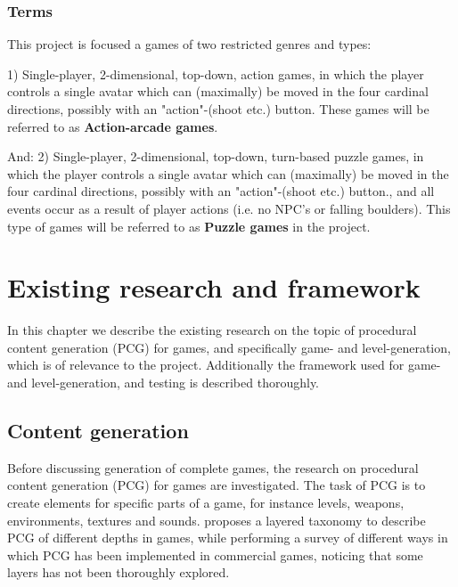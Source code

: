 \documentclass[a4paper,titlepage,final]{report}
\begin{document}
\subsection{Terms}
This project is focused a games of two restricted genres and types: 

1) Single-player, 2-dimensional, top-down, action games, in which the player controls a single avatar which can (maximally) be moved in the four cardinal directions, possibly with an "action"-(shoot etc.) button.
These games will be referred to as \textbf{Action-arcade games}.

And: 2) Single-player, 2-dimensional, top-down, turn-based puzzle games, in which the player controls a single avatar which can (maximally) be moved in the four cardinal directions, possibly with an "action"-(shoot etc.) button., and all events occur as a result of player actions (i.e. no NPC's or falling boulders). 
This type of games will be referred to as \textbf{Puzzle games} in the project.

\chapter{Existing research and framework}
In this chapter we describe the existing research on the topic of procedural content generation (PCG) for games, and specifically game- and level-generation, which is of relevance to the project.
Additionally the framework used for game- and level-generation, and testing is described thoroughly.



\section{Content generation}

Before discussing generation of complete games, the research on procedural content generation (PCG) for games are investigated. 
The task of PCG is to create elements for specific parts of a game, for instance levels, weapons, environments, textures and sounds. 
\citet{hendrikx2013procedural} proposes a layered taxonomy to describe PCG of different depths in games, while performing a survey of different ways in which PCG has been implemented in commercial games, noticing that some layers has not been thoroughly explored.
\end{document}
